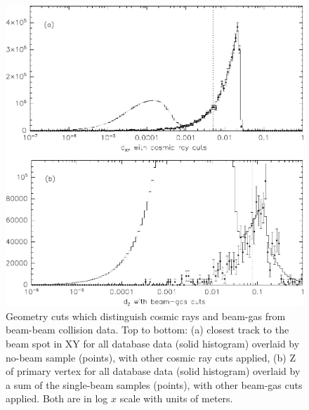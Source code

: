 \begin{figure}[p]
  \begin{center}
    \includegraphics[width=\linewidth]{plots/datasets_database_dxydzcuts}
  \end{center}
  \caption{\label{datasets:dxydzcuts} Geometry cuts which distinguish
    cosmic rays and beam-gas from beam-beam collision data.  Top to
    bottom: (a) closest track to the beam spot in XY for all database
    data (solid histogram) overlaid by no-beam sample (points), with
    other cosmic ray cuts applied, (b) Z of primary vertex for all
    database data (solid histogram) overlaid by a sum of the
    single-beam samples (points), with other beam-gas cuts applied.
    Both are in log $x$ scale with units of meters.}
\end{figure}
